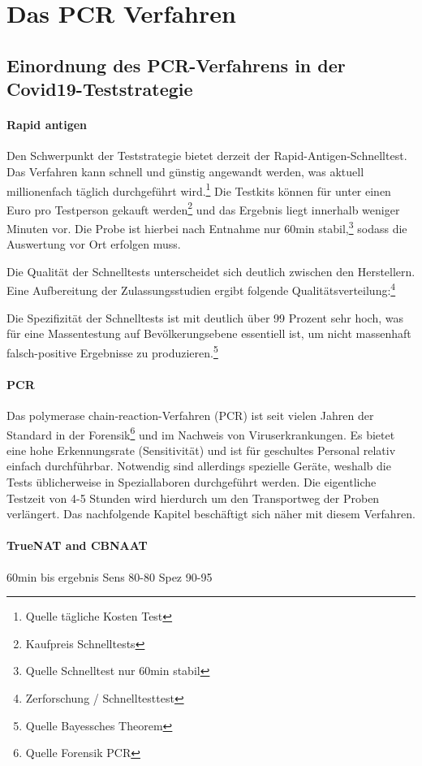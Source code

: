 \chapter{Das PCR Verfahren}
\section{Einordnung des PCR-Verfahrens in der Covid19-Teststrategie}
\subsubsection{Rapid antigen}
Den Schwerpunkt der Teststrategie bietet derzeit der Rapid-Antigen-Schnelltest.
Das Verfahren kann schnell und günstig angewandt werden, was aktuell millionenfach täglich durchgeführt wird.\footnote{Quelle tägliche Kosten Test}
Die Testkits können für unter einen Euro pro Testperson gekauft werden\footnote{Kaufpreis Schnelltests}
und das Ergebnis liegt innerhalb weniger Minuten vor.
Die Probe ist hierbei nach Entnahme nur 60min stabil,\footnote{Quelle Schnelltest nur 60min stabil}
sodass die Auswertung vor Ort erfolgen muss.

Die Qualität der Schnelltests unterscheidet sich deutlich zwischen den Herstellern.
Eine Aufbereitung der Zulassungsstudien ergibt folgende Qualitätsverteilung:\footnote{Zerforschung / Schnelltesttest}

Die Spezifizität der Schnelltests ist mit deutlich über 99 Prozent sehr hoch, was für eine Massentestung auf Bevölkerungsebene essentiell ist, um nicht massenhaft falsch-positive Ergebnisse zu produzieren.\footnote{Quelle Bayessches Theorem}

\subsubsection{PCR}
Das polymerase chain-reaction-Verfahren (PCR) ist seit vielen Jahren der Standard in der Forensik\footnote{Quelle Forensik PCR}
und im Nachweis von Viruserkrankungen. Es bietet eine hohe Erkennungsrate (Sensitivität) und ist für geschultes Personal relativ einfach durchführbar. Notwendig sind allerdings spezielle Geräte, weshalb die Tests üblicherweise in Speziallaboren durchgeführt werden. Die eigentliche Testzeit von 4-5 Stunden wird hierdurch um den Transportweg der Proben verlängert. Das nachfolgende Kapitel beschäftigt sich näher mit diesem Verfahren. 

\subsubsection{TrueNAT and CBNAAT}
60min bis ergebnis
Sens 80-80
Spez 90-95

